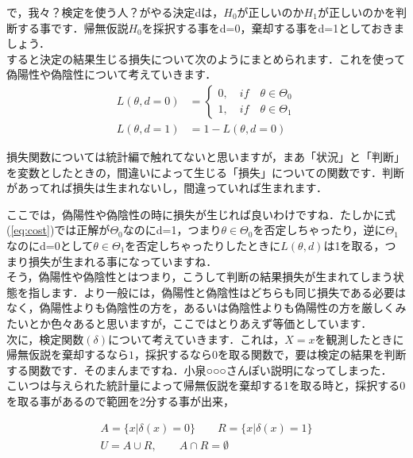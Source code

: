 \documentclass[11pt,a4paper]{ujreport} 	%
\begin{document}
で，我々？検定を使う人？がやる決定dは，$H_0$が正しいのか$H_1$が正しいのかを判断する事です．帰無仮説$H_0$を採択する事をd=0，棄却する事をd=1としておきましょう．\\

すると決定の結果生じる損失について次のようにまとめられます．これを使って偽陽性や偽陰性について考えていきます．\\


\begin{align}
  L(\theta, d=0) &= \left\{
    \begin{array}{l}
    0, \quad if \quad \theta \in \Theta_0\\
    1, \quad if \quad \theta \in \Theta_1
    \end{array}
  \right.\nonumber \\
  L(\theta, d=1) &= 1-L(\theta, d=0) 
  \label{eq:cost}
\end{align}

損失関数については統計編で触れてないと思いますが，まあ「状況」と「判断」を変数としたときの，間違いによって生じる「損失」についての関数です．判断があってれば損失は生まれないし，間違っていれば生まれます．

ここでは，偽陽性や偽陰性の時に損失が生じれば良いわけですね．たしかに式(\ref{eq:cost})では正解が$\Theta_0$なのにd=1，つまり$\theta \in \Theta_0$を否定しちゃったり，逆に$\Theta_1$なのにd=0として$\theta \in \Theta_1$を否定しちゃったりしたときに$L(\theta, d)$は1を取る，つまり損失が生まれる事になっていますね．\\

そう，偽陽性や偽陰性とはつまり，こうして判断の結果損失が生まれてしまう状態を指します．より一般には，偽陽性と偽陰性はどちらも同じ損失である必要はなく，偽陽性よりも偽陰性の方を，あるいは偽陰性よりも偽陽性の方を厳しくみたいとか色々あると思いますが，ここではとりあえず等価としています．\\

次に，検定関数$(\delta)$について考えていきます．これは，$X=x$を観測したときに帰無仮説を棄却するなら$1$，採択するなら$0$を取る関数で，要は検定の結果を判断する関数です．そのまんまですね．小泉○○○さんぽい説明になってしまった．\\

こいつは与えられた統計量によって帰無仮説を棄却する1を取る時と，採択する0を取る事があるので範囲を2分する事が出来，

\begin{align}
  A = \{x| \delta(x) = 0\} \qquad R = \{x| \delta(x) = 1  \}\label{eq:test}\\
  U = A\cup R,\qquad A \cap R = \emptyset
\end{align}
\end{document}
